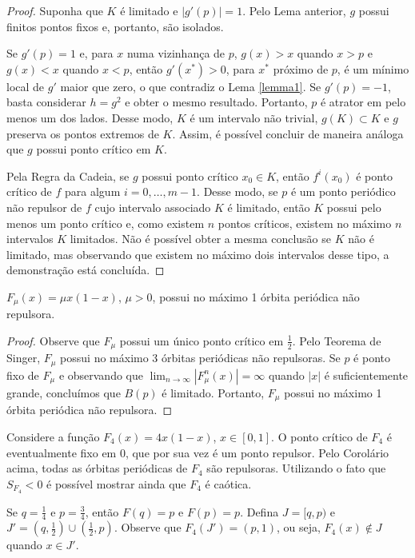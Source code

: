 \begin{proof}
Suponha que $K$ é limitado e $|g'(p)| = 1$. Pelo Lema anterior, $g$ possui finitos pontos fixos e, portanto, são isolados.

Se $g'(p) = 1$ e, para $x$ numa vizinhança de $p$, $g(x) > x$ quando $x > p$ e $g(x) < x$ quando $x < p$, então $g'(x^*) > 0$, para $x^*$ próximo de $p$, é um mínimo local de $g'$ maior que zero, o que contradiz o Lema \ref{lemma1}. Se $g'(p)=-1$, basta considerar $h=g^2$ e obter o mesmo resultado. Portanto, $p$ é atrator em pelo menos um dos lados. Desse modo, $K$ é um intervalo não trivial, $g(K) \subset K$ e $g$ preserva os pontos extremos de $K$. Assim, é possível concluir de maneira análoga que $g$ possui ponto crítico em $K$.

Pela Regra da Cadeia, se $g$ possui ponto crítico $x_0 \in K$, então $f^i(x_0)$ é ponto crítico de $f$ para algum $i = 0, \dots, m-1$. Desse modo, se $p$ é um ponto periódico não repulsor de $f$ cujo intervalo associado $K$ é limitado, então $K$ possui pelo menos um ponto crítico e, como existem $n$ pontos críticos, existem no máximo $n$ intervalos $K$ limitados. Não é possível obter a mesma conclusão se $K$ não é limitado, mas observando que existem no máximo dois intervalos desse tipo, a demonstração está concluída.
\end{proof}

\begin{corollary}
$F_\mu(x) = \mu x(1-x)$, $\mu > 0$, possui no máximo 1 órbita periódica não repulsora.
\end{corollary}

\begin{proof}
Observe que $F_\mu$ possui um único ponto crítico em $\frac{1}{2}$. Pelo Teorema de Singer, $F_\mu$ possui no máximo 3 órbitas periódicas não repulsoras. Se $p$ é ponto fixo de $F_\mu$ e observando que $\lim_{n \to\infty} |F^n_\mu(x)| = \infty$ quando $|x|$ é suficientemente grande, concluímos que $B(p)$ é limitado. Portanto, $F_\mu$ possui no máximo 1 órbita periódica não repulsora.
\end{proof}

Considere a função $F_4(x) = 4x(1-x)$, $x \in [0,1]$. O ponto crítico de $F_4$ é eventualmente fixo em 0, que por sua vez é um ponto repulsor. Pelo Corolário acima, todas as órbitas periódicas de $F_4$ são repulsoras. Utilizando o fato que $S_{F_4} < 0$ é possível mostrar ainda que $F_4$ é caótica. 

Se $q=\frac{1}{4}$ e $p=\frac{3}{4}$, então $F(q)=p$ e $F(p)=p$. Defina $J = [q, p)$ e $J' = \left( q,\frac{1}{2} \right) \cup \left( \frac{1}{2}, p \right)$. Observe que $F_4(J') = \left ( p ,1 \right )$, ou seja, $F_4(x) \notin J$ quando $x \in J'$.

